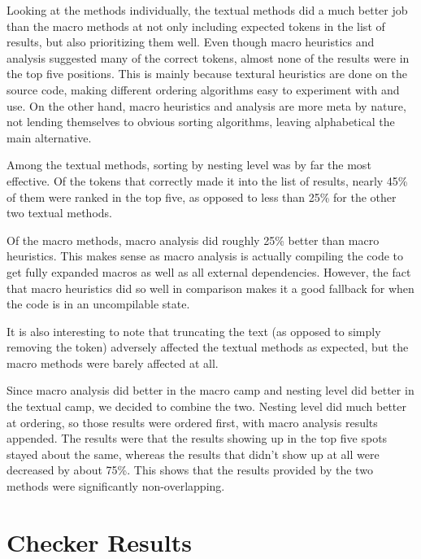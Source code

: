 \documentclass[ms,electronic,twosidetoc,letterpaper,chaptercenter,parttop,lol,lof,lot]{byumsphd}
\begin{document}
Looking at the methods individually, the textual methods did a much better job than the macro methods at not only including expected tokens in the list of results, but also prioritizing them well.
Even though macro heuristics and analysis suggested many of the correct tokens, almost none of the results were in the top five positions.
This is mainly because textural heuristics are done on the source code, making different ordering algorithms easy to experiment with and use.
On the other hand, macro heuristics and analysis are more meta by nature, not lending themselves to obvious sorting algorithms, leaving alphabetical the main alternative.

Among the textual methods, sorting by nesting level was by far the most effective.
Of the tokens that correctly made it into the list of results, nearly 45\% of them were ranked in the top five, as opposed to less than 25\% for the other two textual methods.

Of the macro methods, macro analysis did roughly 25\% better than macro heuristics.
This makes sense as macro analysis is actually compiling the code to get fully expanded macros as well as all external dependencies.
However, the fact that macro heuristics did so well in comparison makes it a good fallback for when the code is in an uncompilable state.

It is also interesting to note that truncating the text (as opposed to simply removing the token) adversely affected the textual methods as expected, but the macro methods were barely affected at all.

Since macro analysis did better in the macro camp and nesting level did better in the textual camp, we decided to combine the two.
Nesting level did much better at ordering, so those results were ordered first, with macro analysis results appended.
The results were that the results showing up in the top five spots stayed about the same, whereas the results that didn't show up at all were decreased by about 75\%.
This shows that the results provided by the two methods were significantly non-overlapping.

\section{Checker Results}
\end{document}
